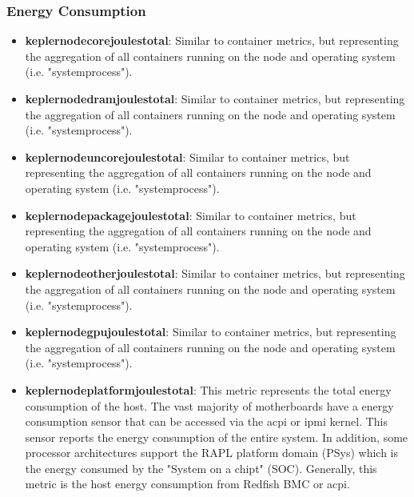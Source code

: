 \subsubsection{Energy Consumption}
\begin{itemize}
    \item \textbf{kepler\textunderscore node\textunderscore core\textunderscore joules\textunderscore total}: Similar to container metrics, but representing the aggregation of all containers running on the node and operating system (i.e. "system\textunderscore process").
    \item \textbf{kepler\textunderscore node\textunderscore dram\textunderscore joules\textunderscore total}: Similar to container metrics, but representing the aggregation of all containers running on the node and operating system (i.e. "system\textunderscore process").
    \item \textbf{kepler\textunderscore node\textunderscore uncore\textunderscore joules\textunderscore total}: Similar to container metrics, but representing the aggregation of all containers running on the node and operating system (i.e. "system\textunderscore process").
    \item \textbf{kepler\textunderscore node\textunderscore package\textunderscore joules\textunderscore total}: Similar to container metrics, but representing the aggregation of all containers running on the node and operating system (i.e. "system\textunderscore process").
    \item \textbf{kepler\textunderscore node\textunderscore other\textunderscore joules\textunderscore total}: Similar to container metrics, but representing the aggregation of all containers running on the node and operating system (i.e. "system\textunderscore process").
    \item \textbf{kepler\textunderscore node\textunderscore gpu\textunderscore joules\textunderscore total}: Similar to container metrics, but representing the aggregation of all containers running on the node and operating system (i.e. "system\textunderscore process").
    \item \textbf{kepler\textunderscore node\textunderscore platform\textunderscore joules\textunderscore total}: This metric represents the total energy consumption of the host.
    The vast majority of motherboards have a energy consumption sensor that can be accessed via the acpi or ipmi kernel. This sensor reports the energy consumption of the entire system. In addition, some processor architectures support the RAPL platform domain (PSys) which is the energy consumed by the "System on a chipt" (SOC).
    Generally, this metric is the host energy consumption from Redfish BMC or acpi.
\end{itemize}

